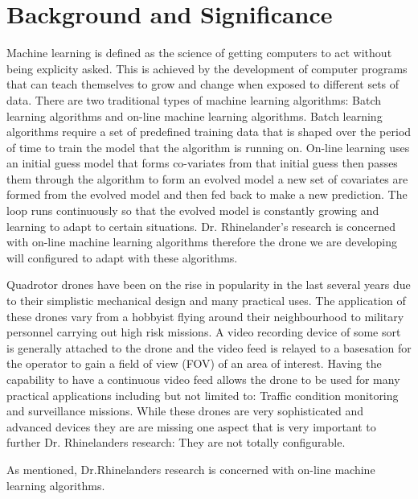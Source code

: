 \section{Background and Significance}
Machine learning is defined as the science of getting computers to act without being explicity asked. This is achieved by the development of computer programs that can teach themselves to grow and change when exposed to different sets of data. There are two traditional types of machine learning algorithms: Batch learning algorithms and on-line machine learning algorithms. Batch learning algorithms require a set of predefined training data that is shaped over the period of time to train the model that the algorithm is running on. On-line learning uses an initial guess model that forms co-variates from that initial guess then passes them through the algorithm to form an evolved model a new set of covariates are formed from the evolved model and then fed back to make a new prediction. The loop runs continuously so that the evolved model is constantly growing and learning to adapt to certain situations. Dr. Rhinelander's research is concerned with on-line machine learning algorithms therefore the drone we are developing will configured to adapt with these algorithms. 

Quadrotor drones have been on the rise in popularity in the last several years due to their simplistic mechanical design and many practical uses. The application of these drones vary from a hobbyist flying around their neighbourhood to military personnel carrying out high risk missions. A video recording device of some sort is generally attached to the drone and the video feed is relayed to a basesation for the operator to gain a field of view (FOV) of an area of interest. Having the capability to have a continuous video feed allows the drone to be used for many practical applications including but not limited to: Traffic condition monitoring and surveillance missions. While these drones are very sophisticated and advanced devices they are are missing one aspect that is very important to further Dr. Rhinelanders research: They are not totally configurable. 

As mentioned, Dr.Rhinelanders research is concerned with on-line machine learning algorithms. 